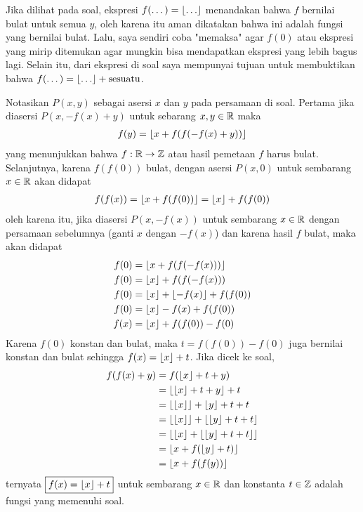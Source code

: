 
\newline

\begin{motivasi}
    Jika dilihat pada soal, ekspresi $f(\dots) = \floor{\dots}$ menandakan bahwa $f$ bernilai bulat untuk semua $y$, oleh karena itu aman dikatakan bahwa ini adalah fungsi yang bernilai bulat. Lalu, saya sendiri coba "memaksa" agar $f(0)$ atau ekspresi yang mirip ditemukan agar mungkin bisa mendapatkan ekspresi yang lebih bagus lagi. Selain itu, dari ekspresi di soal saya mempunyai tujuan untuk membuktikan bahwa $f(\dots) = \floor{\dots} + \text{sesuatu}$.
\end{motivasi}
\begin{solusi}
    Notasikan $P(x,y)$ sebagai asersi $x$ dan $y$ pada persamaan di soal. Pertama jika diasersi $P(x,-f(x)+y)$ untuk sebarang $x,y \in \mathbb R$ maka 
    \begin{align*}
        f(y) = \left\lfloor x + f(f(-f(x)+y)) \right\rfloor
    \end{align*}
    yang menunjukkan bahwa $f: \mathbb R \to \mathbb Z$ atau hasil pemetaan $f$ harus bulat.
    Selanjutnya, karena $f(f(0))$ bulat, dengan asersi $P(x,0)$ untuk sembarang $x \in \mathbb R$ akan didapat
    \begin{align*}
        f(f(x)) = \left\lfloor x+f(f(0)) \right\rfloor = \left\lfloor x \right\rfloor+f(f(0))
    \end{align*}
    oleh karena itu, jika diasersi $P(x,-f(x))$ untuk sembarang $x \in \mathbb R$ dengan persamaan sebelumnya (ganti $x$ dengan $-f(x)$) dan karena hasil $f$ bulat, maka akan didapat
    \begin{align*}
        f(0) &= \left\lfloor x+f(f(-f(x))) \right\rfloor\\
        f(0) &= \left\lfloor x \right\rfloor + f(f(-f(x)))\\
        f(0) &= \left\lfloor x \right\rfloor + \left\lfloor -f(x) \right\rfloor + f(f(0))\\
        f(0) &= \left\lfloor x \right\rfloor -f(x) + f(f(0))\\
        f(x) &= \left\lfloor x \right\rfloor + f(f(0))-f(0)
    \end{align*}
    Karena $f(0)$ konstan dan bulat, maka $t = f(f(0))-f(0)$ juga bernilai konstan dan bulat sehingga $f(x) = \left\lfloor x \right\rfloor+t$. Jika dicek ke soal,
    \begin{align*}
        f(f(x)+y)&=f(\left\lfloor x \right\rfloor+t+y)\\
                &=\left\lfloor \left\lfloor x \right\rfloor+t+y \right\rfloor+t\\
                &=\left\lfloor \left\lfloor x \right\rfloor \right\rfloor+\left\lfloor y \right\rfloor+t+t\\
                &= \left\lfloor \left\lfloor x \right\rfloor \right\rfloor + \left\lfloor \left\lfloor y \right\rfloor+t+t \right\rfloor\\
                &= \left\lfloor \left\lfloor x \right\rfloor+\left\lfloor \left\lfloor y \right\rfloor+t+t \right\rfloor \right\rfloor\\
                &= \left\lfloor x+f(\left\lfloor y \right\rfloor+t) \right\rfloor\\
                &= \left\lfloor x+f(f(y)) \right\rfloor
    \end{align*}
    ternyata $\boxed{f(x) = \left\lfloor x \right\rfloor + t}$ untuk sembarang $x \in \mathbb R$ dan konstanta $t \in \mathbb Z$ adalah fungsi yang memenuhi soal. 
    
\end{solusi}